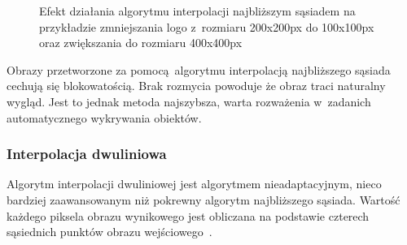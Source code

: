 \begin{figure}[h]
    \centering
    \qquad
    \qquad
    \caption{Efekt działania algorytmu interpolacji najbliższym sąsiadem na przykładzie zmniejszania logo \bk z~rozmiaru 200x200px do 100x100px oraz zwiększania do rozmiaru 400x400px}
    \label{fig:nearestneighbour-result}
\end{figure}

Obrazy przetworzone za pomocą algorytmu interpolacją najbliższego sąsiada cechują się blokowatością. Brak rozmycia powoduje że obraz traci naturalny wygląd. Jest to jednak metoda najszybsza, warta rozważenia w~zadanich automatycznego wykrywania obiektów.

\subsubsection{Interpolacja dwuliniowa}
Algorytm interpolacji dwuliniowej jest algorytmem nieadaptacyjnym, nieco bardziej zaawansowanym niż pokrewny algorytm najbliższego sąsiada. Wartość każdego piksela obrazu wynikowego jest obliczana na podstawie czterech sąsiednich punktów obrazu wejściowego~\cite{algorytmy:bilinear}.

